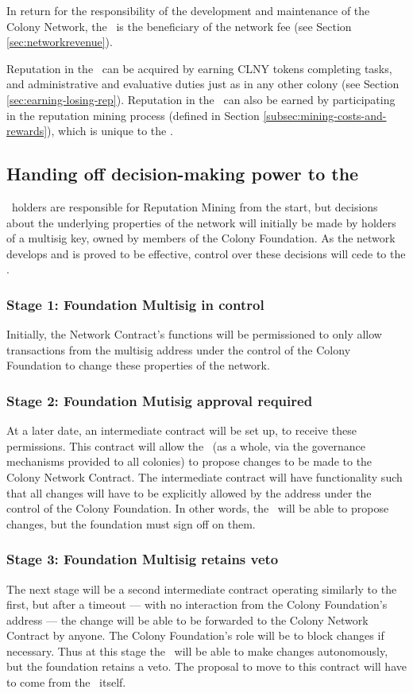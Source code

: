 In return for the responsibility of the development and maintenance of the Colony Network, the \rc\ is the beneficiary of the network fee (see Section \ref{sec:networkrevenue}).

Reputation in the \rc\ can be acquired by earning CLNY tokens completing tasks, and administrative and evaluative duties just as in any other colony (see Section \ref{sec:earning-losing-rep}). Reputation in the \rc\ can also be earned by participating in the reputation mining process (defined in Section \ref{subsec:mining-costs-and-rewards}), which is unique to the \rc.

\subsection{Handing off decision-making power to the \rc}\label{subsec:ceding-control-to-rc}
\rct\ holders are responsible for Reputation Mining from the start, but decisions about the underlying properties of the network will initially be made by holders of a multisig key, owned by members of the Colony Foundation. As the network develops and is proved to be effective, control over these decisions will cede to the \rc.

\subsubsection*{Stage 1: Foundation Multisig in control}
Initially, the Network Contract's functions will be permissioned to only allow transactions from the multisig address under the control of the Colony Foundation to change these properties of the network. 

\subsubsection*{Stage 2: Foundation Mutisig approval required}
At a later date, an intermediate contract will be set up, to receive these permissions. This contract will allow the \rc\ (as a whole, via the governance mechanisms provided to all colonies) to propose changes to be made to the Colony Network Contract. The intermediate contract will have functionality such that all changes will have to be explicitly allowed by the address under the control of the Colony Foundation. In other words, the \rc\ will be able to propose changes, but the foundation must sign off on them.

\subsubsection*{Stage 3: Foundation Multisig retains veto}
The next stage will be a second intermediate contract operating similarly to the first, but after a timeout --- with no interaction from the Colony Foundation's address --- the change will be able to be forwarded to the Colony Network Contract by anyone. The Colony Foundation's role will be to block changes if necessary. Thus at this stage the \rc\ will be able to make changes autonomously, but the foundation retains a veto.  The proposal to move to this contract will have to come from the \rc\ itself. 


